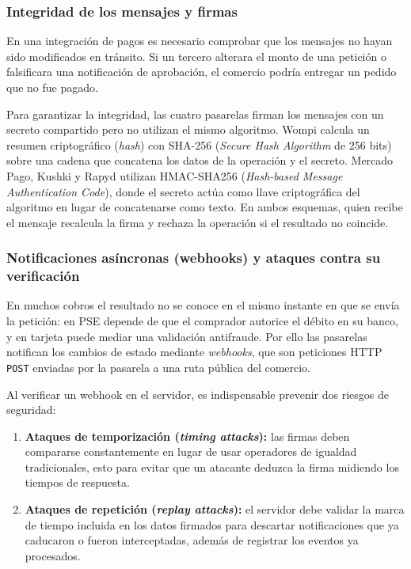 \subsubsection{Integridad de los mensajes y firmas}
En una integración de pagos es necesario comprobar que los mensajes no hayan sido modificados en tránsito. Si un tercero alterara el monto de una petición o falsificara una notificación de aprobación, el comercio podría entregar un pedido que no fue pagado.

Para garantizar la integridad, las cuatro pasarelas firman los mensajes con un secreto compartido pero no utilizan el mismo algoritmo. Wompi calcula un resumen criptográfico (\textit{hash}) con SHA-256 (\textit{Secure Hash Algorithm} de 256 bits) sobre una cadena que concatena los datos de la operación y el secreto. Mercado Pago, Kushki y Rapyd utilizan HMAC-SHA256 (\textit{Hash-based Message Authentication Code}), donde el secreto actúa como llave criptográfica del algoritmo en lugar de concatenarse como texto. En ambos esquemas, quien recibe el mensaje recalcula la firma y rechaza la operación si el resultado no coincide.

\subsubsection{Notificaciones asíncronas (webhooks) y ataques contra su verificación}
En muchos cobros el resultado no se conoce en el mismo instante en que se envía la petición: en PSE depende de que el comprador autorice el débito en su banco, y en tarjeta puede mediar una validación antifraude. Por ello las pasarelas notifican los cambios de estado mediante \textit{webhooks}, que son peticiones HTTP \texttt{POST} enviadas por la pasarela a una ruta pública del comercio.

Al verificar un webhook en el servidor, es indispensable prevenir dos riesgos de seguridad:
\begin{enumerate}
    \item \textbf{Ataques de temporización (\textit{timing attacks}):} las firmas deben compararse constantemente en lugar de usar operadores de igualdad tradicionales, esto para evitar que un atacante deduzca la firma midiendo los tiempos de respuesta.
    \item \textbf{Ataques de repetición (\textit{replay attacks}):} el servidor debe validar la marca de tiempo incluida en los datos firmados para descartar notificaciones que ya caducaron o fueron interceptadas, además de registrar los eventos ya procesados.
\end{enumerate}

